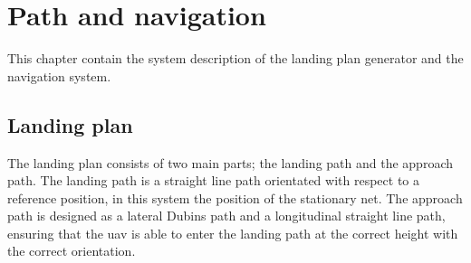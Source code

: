 \chapter{Path and navigation}\label{CH:PathNavigation}
This chapter contain the system description of the landing plan generator and the navigation system.
\section{Landing plan}\label{Ch:LandingPlan}
The landing plan consists of two main parts; the landing path and the approach path. The landing path is a straight line path orientated with respect to a reference position, in this system the position of the stationary net. The approach path is designed as a lateral Dubins path and a longitudinal straight line path, ensuring that the \gls{uav} is able to enter the landing path at the correct height with the correct orientation.
